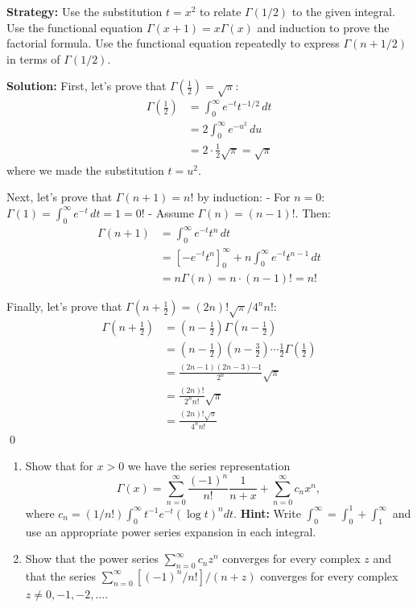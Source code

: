 \noindent\textbf{Strategy:} Use the substitution $t = x^2$ to relate $\Gamma(1/2)$ to the given integral. Use the functional equation $\Gamma(x+1) = x\Gamma(x)$ and induction to prove the factorial formula. Use the functional equation repeatedly to express $\Gamma(n + 1/2)$ in terms of $\Gamma(1/2)$.

\bigskip\noindent\textbf{Solution:}
First, let's prove that $\Gamma(\frac{1}{2}) = \sqrt{\pi}$:
\begin{align*}
\Gamma\left(\frac{1}{2}\right) &= \int_{0}^{\infty} e^{-t} t^{-1/2} \, dt \\
&= 2 \int_{0}^{\infty} e^{-u^{2}} \, du \\
&= 2 \cdot \frac{1}{2} \sqrt{\pi} = \sqrt{\pi}
\end{align*}
where we made the substitution $t = u^{2}$.

Next, let's prove that $\Gamma(n + 1) = n!$ by induction:
- For $n = 0$: $\Gamma(1) = \int_{0}^{\infty} e^{-t} \, dt = 1 = 0!$
- Assume $\Gamma(n) = (n-1)!$. Then:
\begin{align*}
\Gamma(n + 1) &= \int_{0}^{\infty} e^{-t} t^{n} \, dt \\
&= \left[-e^{-t} t^{n}\right]_{0}^{\infty} + n \int_{0}^{\infty} e^{-t} t^{n-1} \, dt \\
&= n \Gamma(n) = n \cdot (n-1)! = n!
\end{align*}

Finally, let's prove that $\Gamma(n + \frac{1}{2}) = (2n)! \sqrt{\pi}/4^{n}n!$:
\begin{align*}
\Gamma\left(n + \frac{1}{2}\right) &= \left(n - \frac{1}{2}\right) \Gamma\left(n - \frac{1}{2}\right) \\
&= \left(n - \frac{1}{2}\right) \left(n - \frac{3}{2}\right) \cdots \frac{1}{2} \Gamma\left(\frac{1}{2}\right) \\
&= \frac{(2n-1)(2n-3) \cdots 1}{2^{n}} \sqrt{\pi} \\
&= \frac{(2n)!}{2^{n} n!} \sqrt{\pi} \\
&= \frac{(2n)! \sqrt{\pi}}{4^{n} n!}
\end{align*}\qed


\begin{problembox}
\begin{problemstatement}
\begin{enumerate}[label=(\alph*)]
\item Show that for $x > 0$ we have the series representation
\[\Gamma(x) = \sum_{n=0}^{\infty} \frac{(-1)^n}{n!} \frac{1}{n + x} + \sum_{n=0}^{\infty} c_n x^n,\]
where $c_n = (1/n!) \int_0^\infty t^{-1} e^{-t} (\log t)^n dt$. \textbf{Hint:} Write $\int_0^\infty = \int_0^1 + \int_1^\infty$ and use an appropriate power series expansion in each integral.
\item Show that the power series $\sum_{n=0}^{\infty} c_n z^n$ converges for every complex $z$ and that the series $\sum_{n=0}^{\infty} [(-1)^n / n!]/(n + z)$ converges for every complex $z \neq 0, -1, -2, \ldots$.
\end{enumerate}
\end{problemstatement}
\end{problembox}

